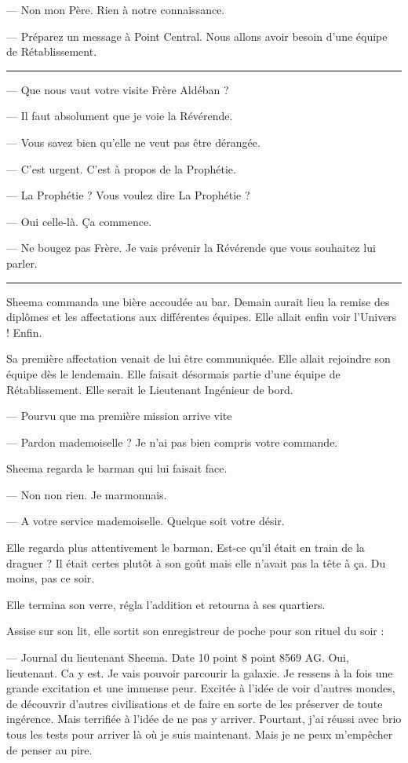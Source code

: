 \documentclass[ebook,12pt,oneside,onecolumn,openright,draft]{memoir}
\begin{document}
  --- Non mon Père. Rien à notre connaissance.

  --- Préparez un message à Point Central. Nous allons avoir besoin d'une équipe
de Rétablissement.


\fancybreak{\pfbreakdisplay}

 — Que nous vaut votre visite Frère Aldéban ?

  — Il faut absolument que je voie la Révérende.

  — Vous savez bien qu'elle ne veut pas être dérangée.

  — C'est urgent. C’est à propos de la Prophétie.

  — La Prophétie ? Vous voulez dire La Prophétie ?

  — Oui celle-là. Ça commence.

— Ne bougez pas Frère. Je vais prévenir la Révérende que vous souhaitez lui
parler.

\fancybreak{\pfbreakdisplay}

Sheema commanda une bière accoudée au bar. Demain aurait lieu la remise des
diplômes et les affectations aux différentes équipes. Elle allait enfin voir
l'Univers ! Enfin.

Sa première affectation venait de lui être communiquée. Elle allait rejoindre
son équipe dès le lendemain. Elle faisait désormais partie d'une équipe de
Rétablissement. Elle serait le Lieutenant Ingénieur de bord.

--- Pourvu que ma première mission arrive vite

--- Pardon mademoiselle ? Je n'ai pas bien compris votre commande.

Sheema regarda le barman qui lui faisait face.

--- Non non rien. Je marmonnais.

--- A votre service mademoiselle. Quelque soit votre désir.

Elle regarda plus attentivement le barman. Est-ce qu'il était en train de la
draguer ? Il était certes plutôt à son goût mais elle n'avait pas la tête à ça.
Du moins, pas ce soir.

Elle termina son verre, régla l'addition et retourna à ses quartiers.

Assise sur son lit, elle sortit son enregistreur de poche pour son rituel du
soir :

--- Journal du lieutenant Sheema. Date 10 point 8 point 8569 AG. Oui,
lieutenant. Ca y est. Je vais pouvoir parcourir la galaxie. Je ressens à la fois
une grande excitation et une immense peur. Excitée à l'idée de voir d'autres
mondes, de découvrir d'autres civilisations et de faire en sorte de les
préserver de toute ingérence. Mais terrifiée à l'idée de ne pas y arriver.
Pourtant, j'ai réussi avec brio tous les tests pour arriver là où je suis
maintenant. Mais je ne peux m'empêcher de penser au pire.
\end{document}
